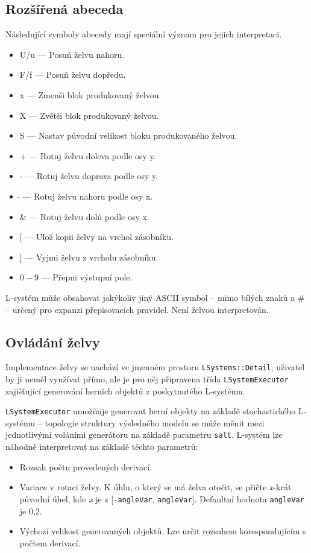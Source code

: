 \documentclass[thesis=M,czech]{FITthesis}[2019/12/23]
\begin{document}
\subsection{Rozšířená abeceda}
Následující symboly abecedy mají speciální význam pro jejich interpretaci.

\begin{itemize}
\item U/u --- Posuň želvu nahoru.
\item F/f --- Posuň želvu dopředu.
\item x --- Zmenši blok produkovaný želvou.
\item X --- Zvětši blok produkovaný želvou.
\item S --- Nastav původní velikost bloku produkovaného želvou.
\item + --- Rotuj želvu doleva podle osy y.
\item - --- Rotuj želvu doprava podle osy y.
\item $\hat{}$ --- Rotuj želvu nahoru podle osy x.
\item \& --- Rotuj želvu dolů podle osy x.
\item $[$ --- Ulož kopii želvy na vrchol zásobníku.
\item $]$ --- Vyjmi želvu z vrcholu zásobníku.
\item $0-9$ --- Přepni výstupní pole.
\end{itemize}

L-systém může obsahovat jakýkoliv jiný ASCII symbol -- mimo bílých znaků a \# -- určený pro expanzi přepisovacích pravidel. Není želvou interpretován.

\subsection{Ovládání želvy}
Implementace želvy se nachází ve jmenném prostoru \texttt{LSystems::Detail}, uživa\-tel by ji neměl využívat přímo, ale je pro něj připravena třída \texttt{LSystemExecutor} zajišťující generování herních objektů z poskytnutého L-systému.

\texttt{LSystemExecutor} umožňuje generovat herní objekty na základě stochastického L-systému -- topologie struktury výsledného modelu se může měnit mezi jednotlivými voláními generátoru na základě parametru \texttt{salt}. L-systém lze náhodně interpretovat na základě těchto parametrů:

\begin{itemize}
\item Rozsah počtu provedených derivací.
\item Variace v rotaci želvy. K úhlu, o který se má želva otočit, se přičte \textit{x}-krát původní úhel, kde \textit{x} je z [\texttt{-angleVar}, \texttt{angleVar}]. Defaultní hodnota \texttt{angleVar} je 0,2.
\item Výchozí velikost generovaných objektů. Lze určit rozsahem korespondujícím s počtem derivací.
\end{itemize}
\end{document}
